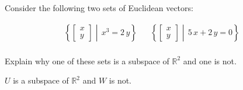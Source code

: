 
\begin{exerciseStatement}


Consider the following two sets of Euclidean vectors: 


\begin{align*}  \left\{ \left[\begin{array}{c}
x \\
y
\end{array}\right] \middle|\,x^{3} = 2 \, y\right\}  & &   \left\{ \left[\begin{array}{c}
x \\
y
\end{array}\right] \middle|\,5 \, x + 2 \, y = 0\right\}  \\ \end{align*}
            

 Explain why one of these sets is a subspace of \(\mathbb{R}^ 2 \) and one is not. 


\end{exerciseStatement}
    
\begin{exerciseAnswer} 


\(U\) is a subspace of \(\mathbb{R}^ 2 \) and \(W\) is not.


\end{exerciseAnswer}
    
